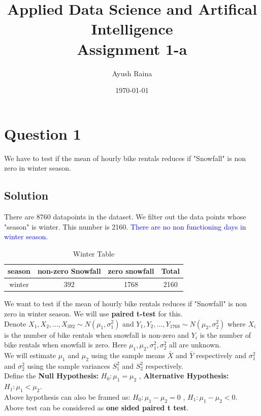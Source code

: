 \documentclass[12pt, letterpaper]{article}
\title{Applied Data Science and Artifical Intelligence \\ Assignment 1-a}
\author{Ayush Raina}
\date{\today}
\begin{document}
\maketitle
\large
\section*{Question 1}
We have to test if the mean of hourly bike rentals reduces if "Snowfall" is non zero in winter season. 
\subsection*{Solution}
There are 8760 datapoints in the dataset. We filter out the data points whose "season" is winter. This number is 2160. \textcolor{blue}{There are no non functioning days in winter season.}

\begin{table}[h]
    \centering
    \begin{tabular}{|c|c|c|c|}
    \hline
    season & non-zero Snowfall & zero snowfall & Total \\ \hline
    winter & 392 & 1768 & 2160 \\ \hline
    \end{tabular}
    \caption{Winter Table}
\end{table}

We want to test if the mean of hourly bike rentals reduces if "Snowfall" is non zero in winter season. We will use \textbf{paired t-test} for this. \\

Denote $X_1,X_2,...,X_{392} \sim N(\mu_1,\sigma_1^2)$ and $Y_1,Y_2,...,Y_{1768} \sim N(\mu_2,\sigma_2^2)$ where $X_i$ is the number of bike rentals when snowfall is non-zero and $Y_i$ is the number of bike rentals when snowfall is zero. Here $\mu_1,\mu_2, \sigma_1^2, \sigma_2^2$ all are unknown. \\

We will estimate $\mu_1$ and $\mu_2$ using the sample means $\bar{X}$ and $\bar{Y}$ respectively and $\sigma_1^2$ and $\sigma_2^2$ using the sample variances $S_1^2$ and $S_2^2$ respectively. \\

Define the \textbf{Null Hypothesis:} $H_0: \mu_1 = \mu_2$ ,  \textbf{Alternative Hypothesis:} $H_1: \mu_1 < \mu_2$. \\

Above hypothesis can also be framed as: $H_0: \mu_1 - \mu_2 = 0$ ,  $H_1: \mu_1 - \mu_2 < 0$. \\
Above test can be considered as \textbf{one sided paired t test}. \\
\end{document}
